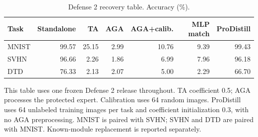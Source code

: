 \begin{table}[t]
\centering\small
\setlength{\tabcolsep}{4pt}
\caption{Defense 2 recovery table. Accuracy (\%).}
\label{tab:defense2_versions}
\begin{tabular}{@{}lrrrrrr@{}}
\toprule
Task & Standalone & TA & AGA & AGA+calib. & MLP match & ProDistill \\
\midrule
MNIST & 99.57 & 25.15 & 2.99 & 10.76 & 9.39 & 99.43 \\
\midrule
SVHN & 96.66 & 2.26 & 1.86 & 6.99 & 7.96 & 96.18 \\
\midrule
DTD & 76.33 & 2.13 & 2.07 & 5.00 & 2.29 & 66.70 \\
\bottomrule
\end{tabular}
\par\smallskip
\begin{minipage}{\textwidth}\footnotesize This table uses one frozen Defense 2 release throughout. TA coefficient 0.5; AGA processes the protected expert. Calibration uses 64 random images. ProDistill uses 64 unlabeled training images per task and coefficient initialization 0.3, with no AGA preprocessing. MNIST is paired with SVHN; SVHN and DTD are paired with MNIST. Known-module replacement is reported separately.\end{minipage}
\end{table}

